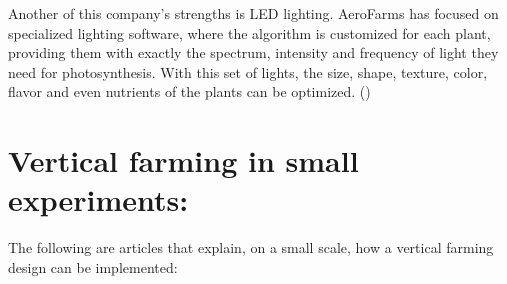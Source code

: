 \documentclass[10pt]{article}
\begin{document}
\begin{mdframed}[backgroundcolor=NavyBlue!5,middlelinecolor=MidnightBlue,
                 middlelinewidth=2pt,shadow=false,roundcorner=3pt]
\begin{center}
\begin{minipage}{.3\textwidth}
              \label{fig:sub2}
           \end{minipage}

           \label{fig:test}
        \end{center}
        
    \end{mdframed}

    Another of this company's strengths is LED lighting. AeroFarms has focused on specialized lighting software, where the algorithm is customized for each plant, providing them with exactly the spectrum, intensity and frequency of light they need for photosynthesis. With this set of lights, the size, shape, texture, color, flavor and even nutrients of the plants can be optimized. (\cite{AeroFarm2})
    
\section*{Vertical farming in small experiments:}

The following are articles that explain, on a small scale, how a vertical farming design can be implemented:
\end{document}

